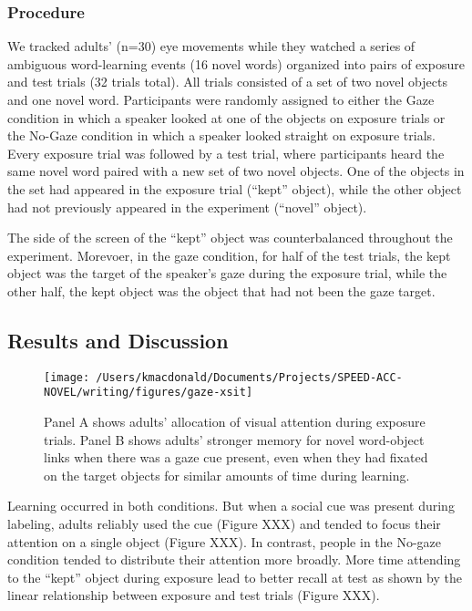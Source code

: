 \documentclass[man,floatsintext]{apa6}
\begin{document}
\hypertarget{procedure-1}{%
\subsubsection{Procedure}\label{procedure-1}}

We tracked adults' (n=30) eye movements while they watched a series of
ambiguous word-learning events (16 novel words) organized into pairs of
exposure and test trials (32 trials total). All trials consisted of a
set of two novel objects and one novel word. Participants were randomly
assigned to either the Gaze condition in which a speaker looked at one
of the objects on exposure trials or the No-Gaze condition in which a
speaker looked straight on exposure trials. Every exposure trial was
followed by a test trial, where participants heard the same novel word
paired with a new set of two novel objects. One of the objects in the
set had appeared in the exposure trial (\enquote{kept} object), while
the other object had not previously appeared in the experiment
(\enquote{novel} object).

The side of the screen of the \enquote{kept} object was counterbalanced
throughout the experiment. Morevoer, in the gaze condition, for half of
the test trials, the kept object was the target of the speaker's gaze
during the exposure trial, while the other half, the kept object was the
object that had not been the gaze target.

\hypertarget{results-and-discussion-1}{%
\subsection{Results and Discussion}\label{results-and-discussion-1}}

\begin{figure}[!t]

{\centering \texttt{[image: /Users/kmacdonald/Documents/Projects/SPEED-ACC-NOVEL/writing/figures/gaze-xsit]} 

}

\caption{Panel A shows adults' allocation of visual attention during exposure trials. Panel B shows adults' stronger memory for novel word-object links when there was a gaze cue present, even when they had fixated on the target objects for similar amounts of time during learning.}\label{fig:plot-e2}
\end{figure}

Learning occurred in both conditions. But when a social cue was present
during labeling, adults reliably used the cue (Figure XXX) and tended to
focus their attention on a single object (Figure XXX). In contrast,
people in the No-gaze condition tended to distribute their attention
more broadly. More time attending to the \enquote{kept} object during
exposure lead to better recall at test as shown by the linear
relationship between exposure and test trials (Figure XXX).
\end{document}

